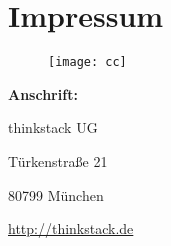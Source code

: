 \documentclass[fleqn,10pt]{SelfArx} %
\begin{document}
\FloatBarrier

\section*{Impressum} %


\begin{figure}[tbhp]
\texttt{[image: cc]}
\end{figure}

\textbf{Anschrift:}

thinkstack UG

Türkenstraße 21

80799 München

\url{http://thinkstack.de}


%

\end{document}
